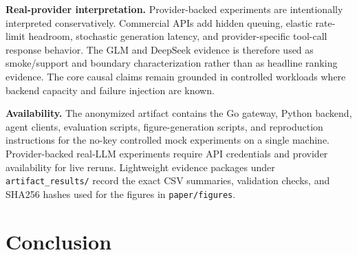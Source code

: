 \documentclass[sigconf,review,anonymous]{acmart}
\begin{document}
\textbf{Real-provider interpretation.}
Provider-backed experiments are intentionally interpreted conservatively. Commercial APIs add hidden queuing, elastic rate-limit headroom, stochastic generation latency, and provider-specific tool-call response behavior. The GLM and DeepSeek evidence is therefore used as smoke/support and boundary characterization rather than as headline ranking evidence. The core causal claims remain grounded in controlled workloads where backend capacity and failure injection are known.

\textbf{Availability.}
The anonymized artifact contains the Go gateway, Python backend, agent clients, evaluation scripts, figure-generation scripts, and reproduction instructions for the no-key controlled mock experiments on a single machine. Provider-backed real-LLM experiments require API credentials and provider availability for live reruns. Lightweight evidence packages under \texttt{artifact\_results/} record the exact CSV summaries, validation checks, and SHA256 hashes used for the figures in \texttt{paper/figures}.

\section{Conclusion}
\end{document}
